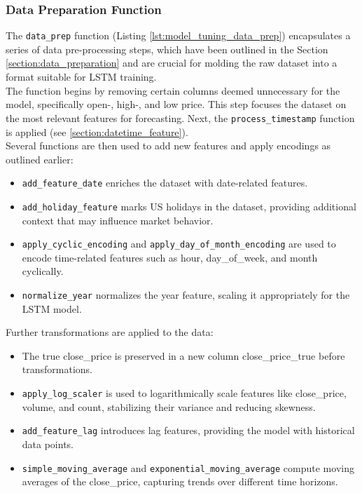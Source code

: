 \subsubsection{Data Preparation Function}
The \texttt{data\_prep} function (Listing \ref{lst:model_tuning_data_prep}) encapsulates a series of data pre-processing steps, which have been outlined in the Section \ref{section:data_preparation} and are crucial for molding the raw dataset into a format suitable for LSTM training. \\  

The function begins by removing certain columns deemed unnecessary for the model, specifically open-, high-, and low price. This step focuses the dataset on the most relevant features for forecasting. Next, the \texttt{process\_timestamp} function is applied (see \ref{section:datetime_feature}). \\

Several functions are then used to add new features and apply encodings as outlined earlier:
\begin{itemize}
    \item \texttt{add\_feature\_date} enriches the dataset with date-related features.
    \item \texttt{add\_holiday\_feature} marks US holidays in the dataset, providing additional context that may influence market behavior.
    \item \texttt{apply\_cyclic\_encoding} and \texttt{apply\_day\_of\_month\_encoding} are used to encode time-related features such as hour, day\_of\_week, and month cyclically.
    \item \texttt{normalize\_year} normalizes the year feature, scaling it appropriately for the LSTM model.
\end{itemize}

Further transformations are applied to the data:
\begin{itemize}
    \item The true close\_price is preserved in a new column close\_price\_true before transformations.
    \item \texttt{apply\_log\_scaler} is used to logarithmically scale features like close\_price, volume, and count, stabilizing their variance and reducing skewness.
    \item \texttt{add\_feature\_lag} introduces lag features, providing the model with historical data points.
    \item \texttt{simple\_moving\_average} and \texttt{exponential\_moving\_average} compute moving averages of the close\_price, capturing trends over different time horizons.
\end{itemize}


